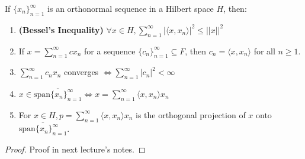 \documentclass[12pt]{article}
\newenvironment{theorem}[2][Theorem]{\begin{trivlist}
\item[\hskip \labelsep {\bfseries #1}\hskip \labelsep {\bfseries #2.}]}{\end{trivlist}}
\begin{document}
\begin{theorem}{(Big Theorem on Orthnormal Sequences)}
    If $\{x_n\}_{n = 1}^\infty$ is an orthonormal sequence in a Hilbert space $H$, then:
    \begin{enumerate}[label=(\alph*)]
        \item \textbf{(Bessel's Inequality)} $\forall x \in H, \sum_{n = 1}^\infty |\langle x, x_n \rangle|^2 \leq ||x||^2$
        \item If $x = \sum_{n = 1}^\infty cx_n$ for a sequence $\{c_n\}_{n = 1}^\infty \subseteq F$, then $c_n = \langle x, x_n \rangle$ for all $n \geq 1$.
        \item $\sum_{n = 1}^\infty c_nx_n$ converges $\Leftrightarrow \sum_{n = 1}^\infty |c_n|^2 < \infty$
        \item $x \in \overline{\text{span}\{x_n\}_{n = 1}^\infty} \Leftrightarrow x = \sum_{n = 1}^\infty \langle x, x_n \rangle x_n$
        \item For $x \in H, p = \sum_{n = 1}^\infty \langle x, x_n \rangle x_n$ is the orthogonal projection of $x$ onto $\overline{\text{span}\{x_n\}_{n = 1}^\infty}$.
    \end{enumerate}
    \begin{proof}
        Proof in next lecture's notes.
    \end{proof}
\end{theorem}
\end{document}
